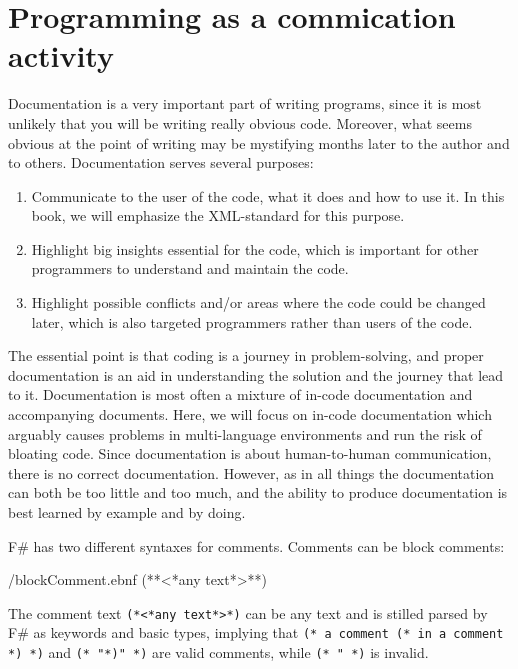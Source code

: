 \documentclass[fsharpNotes.tex]{subfiles}
\begin{document}
\section{Programming as a commication activity}
\label{chap:documentation}
Documentation is a very important part of writing programs, since it is most unlikely that you will be writing really obvious code. Moreover, what seems obvious at the point of writing may be mystifying months later to the author and to others. Documentation serves several purposes:
\begin{enumerate}
\item Communicate to the user of the code, what it does and how to use it. In this book, we will emphasize the XML-standard for this purpose.
\item Highlight big insights essential for the code, which is important for other programmers to understand and maintain the code.
\item Highlight possible conflicts and/or areas where the code could be changed later, which is also targeted programmers rather than users of the code.
\end{enumerate}
The essential point is that coding is a journey in problem-solving, and proper documentation is an aid in understanding the solution and the journey that lead to it. Documentation is most often a mixture of in-code documentation and accompanying documents. Here, we will focus on in-code documentation which arguably causes problems in multi-language environments and run the risk of bloating code. Since documentation is about human-to-human communication, there is no correct documentation. However, as in all things the documentation can both be too little and too much, and the ability to produce documentation is best learned by example and by doing.

F\# has two different syntaxes for comments. Comments can be block
comments: 
%
\begin{verbatimwrite}{\ebnf/blockComment.ebnf}
(**<*any text*>**)
\end{verbatimwrite}
%
The comment text \lstinline[language=syntax]{(*<*any text*>*)} can be any text and is stilled parsed by F\# as keywords and basic types, implying that \lstinline!(* a comment (* in a comment *) *)! and \lstinline[morecomment={[l][\color{commentsColor}]{(*}}]!(* "*)" *)! are valid comments, while \lstinline!(* " *)! is invalid.
\end{document}
